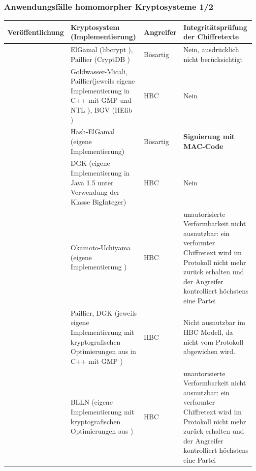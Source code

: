 \documentclass[handout,usenames,dvipsnames]{beamer}
\begin{document}
\begin{frame}
	\frametitle{Anwendungsfälle homomorpher Kryptosysteme 1/2}
		\tiny
		\begin{tabu}{ | l | p{3.2cm} |  p{1cm} |  p{3.7cm} |}
			
			\hline
			\textbf{Veröffentlichung} & \textbf{Kryptosystem (Implementierung)} & \textbf{Angreifer} & \textbf{Integritätsprüfung der Chiffretexte} \\ \hline  \tabucline[1pt]{-}
			
			\cite{tople2013autocrypt} 
			& ElGamal (libcrypt \cite{libcrypt:online}),
			\newline Paillier (CryptDB \cite{popa2011cryptdb})
			& Bösartig
			& Nein, ausdrücklich nicht berücksichtigt \\ \hline
			
			\cite{bost2015machine} 
			& Goldwasser-Micali, Paillier\newline (jeweils eigene Implementierung \cite{ciphermed:online} in C++ mit GMP \cite{gmp:online} und NTL \cite{nlt:online}), BGV (HElib \cite{HElib:online}\cite{halevi2013design})
			& HBC 
			& Nein\\ \hline
			
			\cite{nikolaenko2013privacy}
			& Hash-ElGamal (eigene Implementierung)
			& Bösartig
			& \textbf{Signierung mit MAC-Code}  \\ \hline
			
			\cite{damgaard2007efficient}
			& DGK (eigene Implementierung in Java 1.5 unter Verwendung der Klasse BigInteger)
			& HBC
			& Nein \\ \hline
			
			\cite{kuribayashi2005fingerprinting}
			& Okamoto-Uchiyama (eigene Implementierung %
			)
			& HBC
			& unautorisierte Verformbarkeit nicht ausnutzbar: ein verformter Chiffretext wird im Protokoll nicht mehr zurück erhalten und der Angreifer kontrolliert höchstens eine Partei \\ \hline
			
			\cite{erkin2009privacy} 
			& Paillier, DGK (jeweils eigene Implementierung mit kryptografischen Optimierungen aus \cite{damgaard2001generalisation} in C++ mit GMP \cite{gmp:online})
			& HBC
			& Nicht ausnutzbar im HBC Modell, da nicht vom Protokoll abgewichen wird. \\ \hline
			
			\cite{bos2014private}	
			& BLLN (eigene Implementierung mit kryptografischen Optimierungen aus \cite{brakerski2012fully})
			& HBC
			&  unautorisierte Verformbarkeit nicht ausnutzbar: ein verformter Chiffretext wird im Protokoll nicht mehr zurück erhalten und der Angreifer kontrolliert höchstens eine Partei\\ \hline
		\end{tabu}
\end{frame}	
\end{document}
